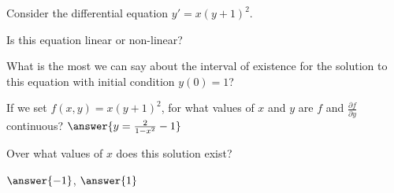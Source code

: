 \documentclass{ximera}
\begin{document}
\begin{exercise}
    Consider the differential equation $y' = x(y+1)^2$. 

    Is this equation linear or non-linear?
    \begin{multipleChoice}
    \end{multipleChoice}
    \begin{problem}
        What is the most we can say about the interval of existence for the solution to this equation with initial condition $y(0) = 1$?
        
        \begin{multipleChoice}
        \end{multipleChoice}
        \begin{problem}
            If we set $f(x,y) = x(y+1)^2$, for what values of $x$ and $y$ are $f$ and $\frac{\partial f}{\partial y}$ continuous? $\answer{y = \frac{2}{1-x^2} - 1}$
            \begin{problem}
                Over what values of $x$ does this solution exist?
                
                \wordChoice{\choice[correct]{(},\choice{[}}$\answer{-1}$, $\answer{1}$\wordChoice{\choice[correct]{)},\choice{]}}
            \end{problem}
        \end{problem}
    \end{problem}

\end{exercise}
\end{document}
